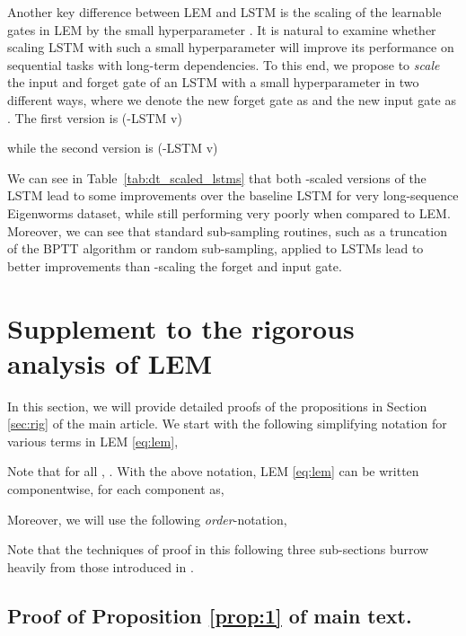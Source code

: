 \documentclass{article} \usepackage{iclr2022_conference,times}
\newcommand{\Tref}[1]{Table~\ref{#1}}
\begin{document}
Another key difference between LEM and LSTM is the scaling of the learnable gates in LEM by the small hyperparameter . It is natural to examine whether scaling LSTM with such a small hyperparameter  will improve its performance on sequential tasks with long-term dependencies. To this end, we propose to \emph{scale} the input and forget gate of an LSTM with a small hyperparameter in two different ways, where we denote the new forget gate as  and the new input gate as . The first version is (-LSTM v)

while the second version is (-LSTM v)


We can see in \Tref{tab:dt_scaled_lstms} that both -scaled versions of the LSTM lead to some improvements over the baseline LSTM for very long-sequence Eigenworms dataset, while still performing very poorly when compared to LEM. Moreover, we can see that standard sub-sampling routines, such as a truncation of the BPTT algorithm or random sub-sampling, applied to LSTMs lead to better improvements than -scaling the forget and input gate.


\section{Supplement to the rigorous analysis of LEM}
\label{sec:rigan}
In this section, we will provide detailed proofs of the propositions in Section \ref{sec:rig} of the main article. We start with the following simplifying notation for various terms in LEM \eqref{eq:lem},

Note that for all , . 
With the above notation, LEM \eqref{eq:lem} can be written componentwise, for each component  as,

Moreover, we will use the following \emph{order}-notation,



Note that the techniques of proof in this following three sub-sections burrow heavily from those introduced in \citet{coRNN}.
\subsection{Proof of Proposition \ref{prop:1} of main text.}
\label{app:hsbdpf}
\end{document}
